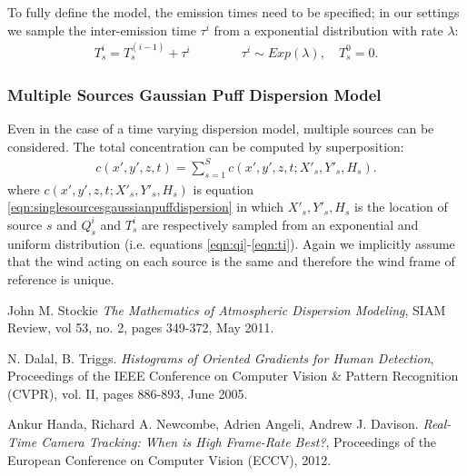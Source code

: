 \documentclass[a4paper,11pt]{report}
\begin{document}
To fully define the model, the emission times need to be specified; in our settings we sample the inter-emission time $\tau^i$ from a exponential distribution with rate $\lambda$:
\begin{align}\label{eqn:ti}
T^i_s = T^{(i-1)}_s + \tau^i   \qquad \qquad \tau^i \sim Exp (\lambda), \quad T^0_s = 0.
\end{align}

\subsubsection{Multiple Sources Gaussian Puff Dispersion Model}

Even in the case of a time varying dispersion model, multiple sources can be considered. The total concentration can be computed by superposition:
\begin{align}\label{eqn:multiplesourcesgaussianpuffdispersion}
c(x',y',z,t) = \sum_{s=1}^S c(x',y',z,t;X'_s,Y'_s,H_s).
\end{align}
where $c(x',y',z,t;X'_s,Y'_s,H_s)$ is equation \ref{eqn:singlesourcesgaussianpuffdispersion} in which $X'_s,Y'_s,H_s$ is the location of source $s$ and $Q^i_s$ and $T^i_s$ are respectively sampled from an exponential and uniform distribution (i.e. equations \ref{eqn:qi}-\ref{eqn:ti}).
Again we implicitly assume that the wind acting on each source is the same and therefore the wind frame of reference is unique.


\begin{thebibliography}{1}

 John M. Stockie {\em The Mathematics of
Atmospheric Dispersion Modeling}, {SIAM} Review, vol 53, no. 2, pages 349-372, May 2011.

 N. Dalal, B. Triggs. {\em Histograms of Oriented Gradients for Human Detection}, Proceedings of the {IEEE} Conference on Computer Vision \& Pattern Recognition (CVPR), vol. II, pages 886-893, June 2005.

 Ankur Handa, Richard A. Newcombe, Adrien Angeli, Andrew J. Davison. {\em Real-Time Camera Tracking: When is High Frame-Rate Best?}, Proceedings of the European Conference on Computer Vision (ECCV), 2012.

\end{thebibliography}
  
\end{document}
